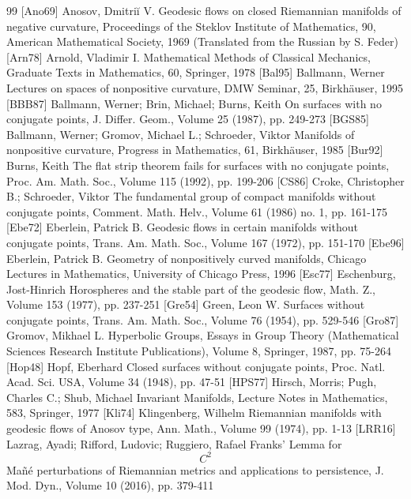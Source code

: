 \documentclass[10pt]{amsart}
\theoremstyle{definition}
\begin{document}
\begin{thebibliography}{99}
 [Ano69] Anosov, Dmitriĭ V. Geodesic flows on closed Riemannian manifolds of negative curvature, Proceedings of the Steklov Institute of Mathematics, 90, American Mathematical Society, 1969 (Translated from the Russian by S. Feder)
 [Arn78] Arnold, Vladimir I. Mathematical Methods of Classical Mechanics, Graduate Texts in Mathematics, 60, Springer, 1978
 [Bal95] Ballmann, Werner Lectures on spaces of nonpositive curvature, DMW Seminar, 25, Birkhäuser, 1995
 [BBB87] Ballmann, Werner; Brin, Michael; Burns, Keith On surfaces with no conjugate points, J. Differ. Geom., Volume 25 (1987), pp. 249-273
 [BGS85] Ballmann, Werner; Gromov, Michael L.; Schroeder, Viktor Manifolds of nonpositive curvature, Progress in Mathematics, 61, Birkhäuser, 1985
 [Bur92] Burns, Keith The flat strip theorem fails for surfaces with no conjugate points, Proc. Am. Math. Soc., Volume 115 (1992), pp. 199-206
 [CS86] Croke, Christopher B.; Schroeder, Viktor The fundamental group of compact manifolds without conjugate points, Comment. Math. Helv., Volume 61 (1986) no. 1, pp. 161-175
 [Ebe72] Eberlein, Patrick B. Geodesic flows in certain manifolds without conjugate points, Trans. Am. Math. Soc., Volume 167 (1972), pp. 151-170
 [Ebe96] Eberlein, Patrick B. Geometry of nonpositively curved manifolds, Chicago Lectures in Mathematics, University of Chicago Press, 1996
 [Esc77] Eschenburg, Jost-Hinrich Horospheres and the stable part of the geodesic flow, Math. Z., Volume 153 (1977), pp. 237-251
 [Gre54] Green, Leon W. Surfaces without conjugate points, Trans. Am. Math. Soc., Volume 76 (1954), pp. 529-546
 [Gro87] Gromov, Mikhael L. Hyperbolic Groups, Essays in Group Theory (Mathematical Sciences Research Institute Publications), Volume 8, Springer, 1987, pp. 75-264
 [Hop48] Hopf, Eberhard Closed surfaces without conjugate points, Proc. Natl. Acad. Sci. USA, Volume 34 (1948), pp. 47-51
 [HPS77] Hirsch, Morris; Pugh, Charles C.; Shub, Michael Invariant Manifolds, Lecture Notes in Mathematics, 583, Springer, 1977
 [Kli74] Klingenberg, Wilhelm Riemannian manifolds with geodesic flows of Anosov type, Ann. Math., Volume 99 (1974), pp. 1-13
 [LRR16] Lazrag, Ayadi; Rifford, Ludovic; Ruggiero, Rafael Franks’ Lemma for $${C}^{2}$$ Mañé perturbations of Riemannian metrics and applications to persistence, J. Mod. Dyn., Volume 10 (2016), pp. 379-411

\end{thebibliography}
\end{document}
